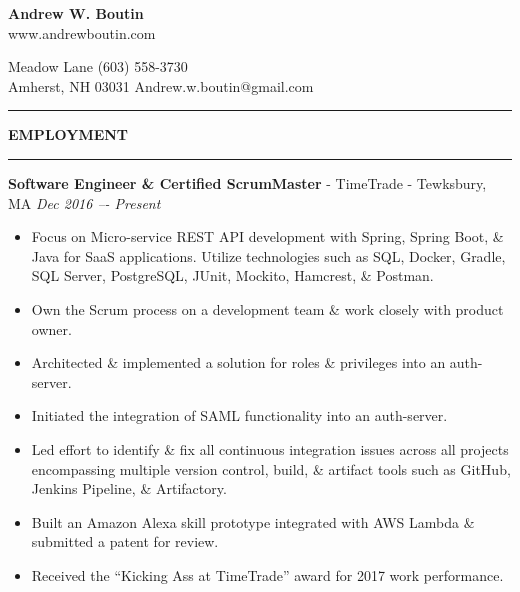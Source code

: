 \documentclass[letterpaper,10pt]{article}
\begin{document}

\thispagestyle{empty}

{\centering
  \textbf{{\fontsize{13}{15.6} \selectfont Andrew W. Boutin}}\\
  www.andrewboutin.com\par
}
 Meadow Lane
\hfill
(603) 558-3730\\
Amherst, NH 03031
\hfill
Andrew.w.boutin@gmail.com%
\vspace{3pt}
\hrule
\vspace{\baselineskip}

\noindent
\textbf{EMPLOYMENT}
\vspace{5pt}
\hrule
\vspace{3pt}
\noindent\textbf{Software Engineer \& Certified ScrumMaster} - TimeTrade - Tewksbury, MA
\hfill
\textit{Dec 2016 –- Present}
\begin{itemize}
\setlength
  \item Focus on Micro-service REST API development with Spring, Spring Boot, \& Java for SaaS applications. Utilize technologies such as SQL, Docker, Gradle, SQL Server, PostgreSQL, JUnit, Mockito, Hamcrest, \& Postman.
  \item Own the Scrum process on a development team \& work closely with product owner.
  \item Architected \& implemented a solution for roles \& privileges into an auth-server.
  \item Initiated the integration of SAML functionality into an auth-server.
  \item Led effort to identify \& fix all continuous integration issues across all projects encompassing multiple version control, build, \& artifact tools such as GitHub, Jenkins Pipeline, \& Artifactory.
  \item Built an Amazon Alexa skill prototype integrated with AWS Lambda \& submitted a patent for review.
  \item Received the “Kicking Ass at TimeTrade” award for 2017 work performance.
\end{itemize}
\vspace{\baselineskip}
\end{document}
